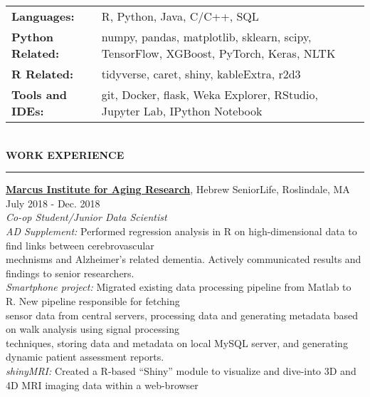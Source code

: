 \documentclass[a4paper]{article}
\newcommand{\myline}{\par
  \kern2pt %
  \hrule height 0.5pt
  \kern2pt %
}
\newcommand{\mybullet}{
	\indent \textbullet \hspace*{2mm}
}
\newcommand{\linetab}{
  \\ \hspace*{9mm}
}
\begin{document}
	\noindent
	\begin{tabular}{ m{3cm} l }
		\textbf{Languages: } & R, Python, Java, C/C++, SQL \\ 
    \textbf{Python Related: } & numpy, pandas, matplotlib, sklearn, scipy, TensorFlow, XGBoost, PyTorch, Keras, NLTK \\ 
    \textbf{R Related: } & tidyverse, caret, shiny, kableExtra, r2d3 \\
		\textbf{Tools and IDEs: } & git, Docker, flask, Weka Explorer, RStudio, 
                Jupyter Lab, IPython Notebook\\
	\end{tabular} \\

	\smallskip
	\smallskip
	\noindent
	{\large \textbf{WORK EXPERIENCE}}
	\myline 
	\smallskip
	
  \noindent
  \textbf{\href{https://www.marcusinstituteforaging.org/}{Marcus Institute for Aging Research}}, 
  Hebrew SeniorLife, Roslindale, MA 
  \hfill July 2018 - Dec. 2018 \\
        \textit{Co-op Student/Junior Data Scientist} \\
        \mybullet \textit{AD Supplement:} Performed regression analysis in R on high-dimensional 
        data to find links between cerebrovascular  \\ \hspace*{9mm} mechnisms 
        and Alzheimer's related dementia. Actively communicated results and findings to senior
        researchers. \\
        \mybullet \textit{Smartphone project:} Migrated existing data processing pipeline from 
        Matlab to R. New pipeline responsible for fetching \linetab sensor data from 
        central servers, processing data and generating metadata based on walk analysis 
        using signal processing \linetab techniques, storing data and metadata on local 
        MySQL server, and generating dynamic patient assessment reports. \\
        \mybullet \textit{shinyMRI: } Created a R-based ``Shiny'' module to visualize and 
        dive-into 3D and 4D MRI imaging data within a web-browser \\
        
	
\end{document}
